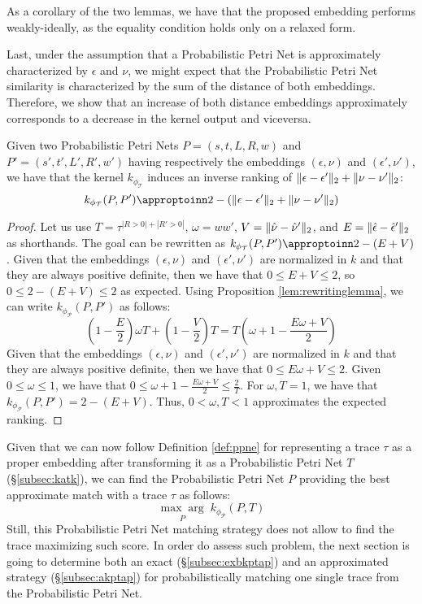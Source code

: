 As a corollary of the two lemmas, we have that the proposed embedding performs weakly-ideally, as the equality condition holds only on a relaxed form.

Last, under the assumption that a Probabilistic Petri Net is approximately characterized by $\epsilon$ and $\nu$, we might expect that the Probabilistic Petri Net similarity is characterized by the sum of the distance of both embeddings. Therefore, we show that an increase of both distance embeddings approximately corresponds to a decrease in the kernel output and viceversa.

\begin{lemma}\label{lem:approxRank}
Given two Probabilistic Petri Nets $P=(s,t,L,R,w)$ and $P'=(s',t',L',R',w')$ having respectively the embeddings $(\epsilon,\nu)$ and $(\epsilon',\nu')$, we have that the kernel $k_{\phi_{\mathcal{T}}}$ induces an inverse ranking of $\|\epsilon-\epsilon'\|_{2}+\|\nu-\nu'\|_{2}$:
$$k_{\phi_{\mathcal{T}}}(P,P')\appropto 2-(\norm{\epsilon-\epsilon'}{2}+\norm{\nu-\nu'}{2})$$
\end{lemma}
\begin{proof}
Let us use $T=\tau^{|R>0|+|R'>0|}$, $\omega=ww'$, $V=\|\hat{\nu}-\hat{\nu}'\|_{2}$, and $E=\|\hat{\epsilon}-\hat{\epsilon}'\|_{2}$ as shorthands. The goal can be rewritten as $k_{\phi_{\mathcal{T}}}(P,P')\appropto 2-(E+V)$. Given that the embeddings $(\epsilon,\nu)$ and $(\epsilon',\nu')$ are normalized in $k$ and that they are always positive definite, then we have that $0\leq E +V\leq 2$, so $0\leq 2-(E+V)\leq 2$ as expected. Using Proposition \ref{lem:rewritinglemma}, we can write $k_{\phi_{\mathcal{P}}}(P,P')$ as follows:
$$\left(1-\frac{E}{2}\right)\omega T+\left(1-\frac{V}{2}\right)T=T\left(\omega+1-\frac{E\omega+V}{2}\right)$$
Given that the embeddings $(\epsilon,\nu)$ and $(\epsilon',\nu')$ are normalized in $k$ and that they are always positive definite, then we have that $0\leq E\omega +V\leq 2$. Given $0\leq \omega\leq 1$, we have that $0\leq \omega+1-\frac{E\omega+V}{2}\leq \frac{2}{T}$. For $\omega,T=1$, we have that $k_{\phi_{\mathcal{P}}}(P,P')=2-(E+V)$. Thus, $0<\omega,T<1$ approximates the expected ranking. 
\end{proof}

Given that we can now follow Definition \ref{def:ppne} for representing a trace $\tau$ as a proper embedding after transforming it as a Probabilistic Petri Net $T$ (\S\ref{subsec:katk}), we can find the Probabilistic Petri Net $P$ providing the best approximate match with  a trace $\tau$ as follows:
\[\underset{{P}}{\max\arg}\;k_{\phi_{\mathcal{P}}}(P,T)\]
Still, this Probabilistic Petri Net matching strategy does not allow to find the trace maximizing such score. In order do assess such problem, the next section is going to determine both an exact (\S\ref{subsec:exbkptap}) and an approximated strategy (\S\ref{subsec:akptap}) for probabilistically matching one single trace from the Probabilistic Petri Net.
